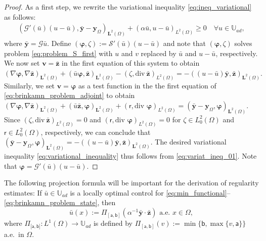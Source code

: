 \documentclass[final]{siamart0216}
\begin{document}
\begin{proof}
As a first step, we rewrite the variational inequality \eqref{eq:ineq_variational} as follows:
\begin{eqnarray}\label{eq:variat_ineq_01}
(\mathcal{G}'(\bar{u})(u-\bar{u}),\bar{\mathbf{y}}-\mathbf{y}_{\Omega})_{\mathbf{L}^2(\Omega)}
+
(\alpha \bar{u},u-\bar{u})_{L^2(\Omega)}\geq 0
\quad
\forall u\in \mathbb{U}_{ad},
\end{eqnarray}
where $\bar{\mathbf{y}}=\mathcal{G}\bar{u}$. Define $(\boldsymbol{\varphi},\zeta):=\mathcal{S}'(\bar{u})(u-\bar{u})$ and note that $(\boldsymbol{\varphi},\zeta)$ solves problem \eqref{eq:problem_S_first} with $u$ and $v$ replaced by $\bar{u}$ and $u-\bar{u}$, respectively. We now set $\mathbf{v}=\bar{\mathbf{z}}$ in the first equation of this system to obtain
$
(\nabla \boldsymbol{\varphi},\nabla \bar{\mathbf{z}})_{\mathbf{L}^2(\Omega)}
+
( \bar{u}\boldsymbol{\varphi}, \bar{\mathbf{z}})_{\mathbf{L}^2(\Omega)}
-
(\zeta,\mathrm{div~} \bar{\mathbf{z}})_{L^2(\Omega)}
=  
-((u-\bar{u})\bar{\mathbf{y}},\bar{\mathbf{z}})_{\mathbf{L}^2(\Omega)}.
$
Similarly, we set $\mathbf{v} = \boldsymbol{\varphi}$ as a test function in the the first equation of \eqref{eq:brinkamn_problem_adjoint} to obtain
$
(\nabla \boldsymbol{\varphi},\nabla \bar{\mathbf{z}})_{\mathbf{L}^2(\Omega)}
+
( \bar{u}\bar{\mathbf{z}}, \boldsymbol{\varphi})_{\mathbf{L}^2(\Omega)}
+
(\mathsf{r},\text{div }\boldsymbol{\varphi})_{L^2(\Omega)} = (\bar{\mathbf{y}}-\mathbf{y}_{\Omega},\boldsymbol{\varphi})_{\mathbf{L}^2(\Omega)}.
$
Since $(\zeta,\mathrm{div~} \bar{\mathbf{z}})_{L^2(\Omega)} = 0$ and $(\mathsf{r},\text{div }\boldsymbol{\varphi})_{L^2(\Omega)} = 0$ for $\zeta \in L_0^2(\Omega)$ and $\mathsf{r} \in L_0^2(\Omega)$, respectively, we can conclude that $(\bar{\mathbf{y}}-\mathbf{y}_{\Omega},\boldsymbol{\varphi})_{\mathbf{L}^2(\Omega)} = -((u-\bar{u})\bar{\mathbf{y}},\bar{\mathbf{z}})_{\mathbf{L}^2(\Omega)}$. The desired variational inequality \eqref{eq:variational_inequality} thus follows from \eqref{eq:variat_ineq_01}. Note that $\boldsymbol{\varphi} = \mathcal{G}'(\bar u)(u - \bar u)$.
\end{proof}

The following projection formula will be important for the derivation of regularity estimates: If $\bar{u} \in \mathbb{U}_{ad}$ is a locally optimal control for  \eqref{eq:min_functional}--\eqref{eq:brinkamn_problem_state}, then \cite[section 4.6.1]{MR2583281}
\begin{equation}\label{eq:representation}
\bar{u}(x):=\Pi_{[\mathsf{a},\mathsf{b}]}(\alpha^{-1}\bar{\mathbf{y}}\cdot\bar{\mathbf{z}})\text{ a.e. } x \in \Omega,
\end{equation}
where $\Pi_{[\mathsf{a},\mathsf{{b}]}}:L^1(\Omega)\to\mathbb{U}_{ad}$ is defined by $\Pi_{[\mathsf{a},\mathsf{b}]}(v):=\min\{\mathsf{b},\max\{v,\mathsf{a}\}\}$ a.e.~in $\Omega$.
\end{document}
